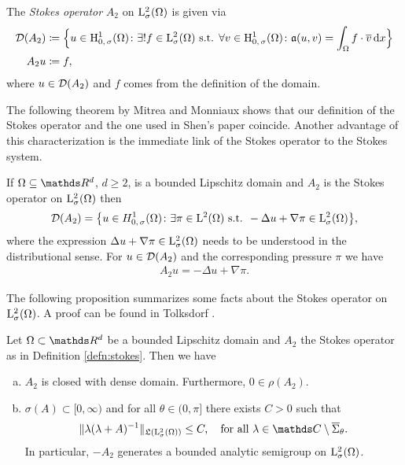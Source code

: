 \begin{defn}
  \label{defn:stokes}
  The \emph{Stokes operator} $A_2$ on $\mathrm{L}_\sigma^2(\Omega)$ is given via
  \begin{align*}
    \mathcal{D}(A_2) &\coloneqq \Big\{ u \in \mathrm{H}_{0,\,\sigma}^1(\Omega) \colon \exists ! f \in \mathrm{L}^2_\sigma(\Omega) \text{ s.t. } \forall v \in \mathrm{H}_{0,\,\sigma}^1(\Omega) \colon \mathfrak{a}(u,v) = \int_\Omega f \cdot \overline v \, {\operatorname{d}\!{x}} \Big\} \\
    A_2 u &\coloneqq f,
  \end{align*}
  where $u \in \mathcal{D}(A_2)$ and $f$ comes from the definition of the domain.
\end{defn}

The following theorem by Mitrea and Monniaux \cite[Thm.\@~4]{mitreaMonniaux} shows that our definition of the Stokes operator and the one used in Shen's paper \cite{Shen2012} coincide. 
Another advantage of this characterization is the immediate link of the Stokes operator to the Stokes system.

\begin{thm}
  \label{thm:stokesOperatorL2}
  If $\Omega \subseteq \R^d$, $d \geq 2$, is a bounded Lipschitz domain and $A_2$ is the Stokes operator on $\mathrm{L}^2_\sigma(\Omega)$ then
  \begin{align*}
    \mathcal{D}(A_2) = \big\{ u \in H^1_{0,\,\sigma}(\Omega) \colon \exists \pi \in \mathrm{L}^2(\Omega) \text{ s.t. } -\Delta u + \nabla \pi \in \mathrm{L}^2_\sigma(\Omega) \big\},
  \end{align*}
  where the expression $\Delta u + \nabla \pi \in\mathrm{L}^2_\sigma(\Omega)$ needs to be understood in the distributional sense.
  For $u \in \mathcal{D}(A_2)$ and the corresponding pressure $\pi$ we have
  \begin{align*}
    A_2 u = -\Delta u + \nabla \pi.
  \end{align*}
\end{thm}

The following proposition summarizes some facts about the Stokes operator on $\mathrm{L}^2_\sigma(\Omega)$. A proof can be found in Tolksdorf \cite[Prop.\@~5.2.5]{tolksdorf}.

\begin{prop}
  \label{prop:stokesOperatorL2}
  Let $\Omega \subset \R^d$ be a bounded Lipschitz domain and $A_2$ the Stokes operator as in Definition \ref{defn:stokes}. Then we have
  \begin{enumerate}[a)]
    \item $A_2$ is closed with dense domain. Furthermore, $0 \in \rho(A_2)$.
    \item $\sigma(A) \subset [0,\infty)$ and for all $\theta \in (0,\pi]$ there exists $C > 0$ such that
      \begin{align}
        \label{eq:resolventEstimateL2}
        \| \lambda(\lambda + A)^{-1} \|_{\Li(\Ell^2_\sigma(\Omega))} \leq C, \quad\text{for all } \lambda \in \C \setminus \overline \Sigma_\theta.
      \end{align}
      In particular, $-A_2$ generates a bounded analytic semigroup on $\mathrm{L}^2_\sigma(\Omega)$.
  \end{enumerate}
\end{prop}

